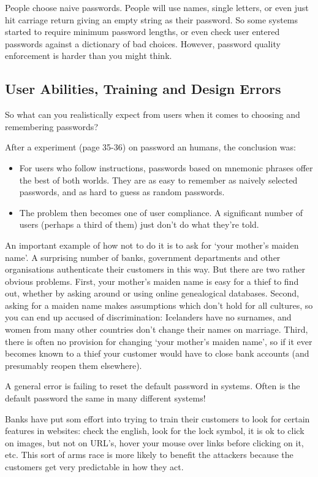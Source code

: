 	People choose naive passwords. People will use names, single letters, or even just hit carriage return
	giving an empty string as their password. So some systems started to require
	minimum password lengths, or even check user entered passwords against a
	dictionary of bad choices. However, password quality enforcement is harder
	than you might think. 



\subsection{User Abilities, Training and Design Errors}
	So what can you realistically expect from users when it comes to
	choosing and remembering passwords?

	After a experiment (page 35-36) on password an humans, the conclusion was:
	\begin{itemize}
		\item For users who follow instructions, passwords based on mnemonic
		phrases offer the best of both worlds. They are as easy to remember as
		naively selected passwords, and as hard to guess as random passwords.
		\item The problem then becomes one of user compliance. A significant number
		of users (perhaps a third of them) just don’t do what they’re told.
	\end{itemize}

	An important example of how not to do it is to ask for ‘your mother’s
	maiden name’. A surprising number of banks, government departments and
	other organisations authenticate their customers in this way. But there are two
	rather obvious problems. First, your mother’s maiden name is easy for a thief
	to find out, whether by asking around or using online genealogical databases.
	Second, asking for a maiden name makes assumptions which don’t hold for
	all cultures, so you can end up accused of discrimination: Icelanders have no
	surnames, and women from many other countries don’t change their names
	on marriage. Third, there is often no provision for changing ‘your mother’s
	maiden name’, so if it ever becomes known to a thief your customer would
	have to close bank accounts (and presumably reopen them elsewhere). 

	A general error is failing to reset the default password in systems. 
	Often is the default password the same in many different systems!

	Banks have put som effort into trying to train their customers to look 
	for certain features in websites: check the english, look for the lock symbol, 
	it is ok to click on images, but not on URL's, hover your mouse over links 
	before clicking on it, etc. This sort of arms race is more likely to benefit
	the attackers because the customers get very predictable in how they act.

